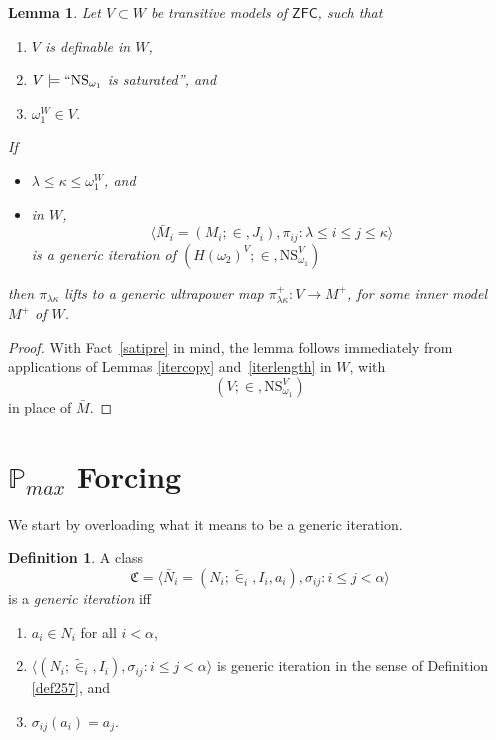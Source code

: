 \documentclass[12pt, twoside]{memoir}
\numberwithin{equation}{section}
\newtheorem{lem}[thm]{Lemma}
\theoremstyle{definition}
\newtheorem{defi}[thm]{Definition}
\theoremstyle{remark}
\theoremstyle{definition}
\theoremstyle{definition}
\theoremstyle{definition}
\theoremstyle{remark}
\begin{document}
\begin{lem}\label{lift}
Let $V \subset W$ be transitive models of $\mathsf{ZFC}$, such that 
\begin{enumerate}[label=(\arabic*)]
    \item $V$ is definable in $W$,
    \item $V \models ``\mathrm{NS}_{\omega_1}$ is saturated'', and
    \item $\omega_1^W \in V$.
\end{enumerate}
If 
\begin{itemize}
    \item $\lambda \leq \kappa \leq \omega_1^W$, and
    \item in $W$, $$\langle \bar{M}_i = (M_i; \in, J_i), \pi_{ij} : \lambda \leq i \leq j \leq \kappa \rangle$$ is a generic iteration of $(H(\omega_2)^V; \in, \mathrm{NS}_{\omega_1}^V)$
\end{itemize}
then $\pi_{\lambda \kappa}$ lifts to a generic ultrapower map $\pi^{+}_{\lambda \kappa} : V \longrightarrow M^+$, for some inner model $M^+$ of $W$.
\end{lem}
\begin{proof}
With Fact~\ref{satipre} in mind, the lemma follows immediately from applications of Lemmas \ref{itercopy} and~\ref{iterlength} in $W$, with $$(V; \in, \mathrm{NS}_{\omega_1}^V)$$ in place of $\bar{M}$.
\end{proof}

\section{\texorpdfstring{$\mathbb{P}_{max}$}{P-max} Forcing}\label{ss27}

We start by overloading what it means to be a generic iteration.

\begin{defi}\label{def269}
A class
\begin{equation*}
    \mathfrak{C} = \langle \bar{N}_i = (N_i; \tilde{\in}_i, I_i, a_i), \sigma_{ij} : i \leq j < \alpha \rangle
\end{equation*}
is a \emph{generic iteration} iff
\begin{enumerate}[label=(\alph*)]
    \item $a_i \in N_i$ for all $i < \alpha$,
    \item $\langle (N_i; \tilde{\in}_i, I_i), \sigma_{ij} : i \leq j < \alpha \rangle$ is generic iteration in the sense of Definition \ref{def257}, and
    \item $\sigma_{ij}(a_i) = a_j$.
\end{enumerate}
\end{defi}
\end{document}
